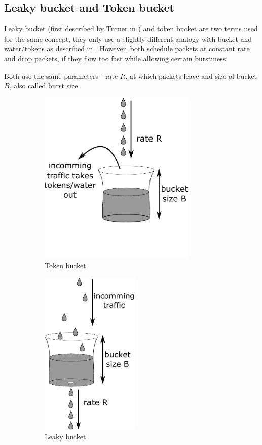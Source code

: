 
\subsection{Leaky bucket and Token bucket}
\label{token_bucket}
Leaky bucket (first described by Turner in \cite{turner1986new}) and token bucket are two terms used for the same concept, they only use a slightly different analogy with bucket and water/tokens as described in \cite[Section 5.4.2]{Tanenbaum:2002:CN:572404}. However, both schedule packets at constant rate and drop packets, if they flow too fast while allowing certain burstiness.

Both use the same parameters - rate $R$, at which packets leave and size of bucket $B$, also called burst size.

\begin{figure}
	\centering
	\begin{subfigure}{.6\linewidth}
		\centering
		\includegraphics[width=75mm]{drawings/token_bucket}
		\caption{Token bucket}
		\label{fig08:token}
	\end{subfigure}%
	\begin{subfigure}{.4\linewidth}
		\centering
		\includegraphics[width=47mm]{drawings/leaky_bucket}
		\caption{Leaky bucket}
		\label{fig08:leaky}
	\end{subfigure}
	\caption{}
	\label{fig08:token_leaky}
\end{figure}

